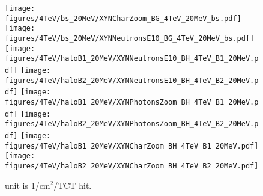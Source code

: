 \begin{figure}
  \begin{center}
    \texttt{[image: figures/4TeV/bs\_20MeV/XYNCharZoom\_BG\_4TeV\_20MeV\_bs.pdf]}
    \texttt{[image: figures/4TeV/bs\_20MeV/XYNNeutronsE10\_BG\_4TeV\_20MeV\_bs.pdf]}
    \texttt{[image: figures/4TeV/haloB1\_20MeV/XYNNeutronsE10\_BH\_4TeV\_B1\_20MeV.pdf]}
    \texttt{[image: figures/4TeV/haloB2\_20MeV/XYNNeutronsE10\_BH\_4TeV\_B2\_20MeV.pdf]}
    \texttt{[image: figures/4TeV/haloB1\_20MeV/XYNPhotonsZoom\_BH\_4TeV\_B1\_20MeV.pdf]}
    \texttt{[image: figures/4TeV/haloB2\_20MeV/XYNPhotonsZoom\_BH\_4TeV\_B2\_20MeV.pdf]}
    \texttt{[image: figures/4TeV/haloB1\_20MeV/XYNCharZoom\_BH\_4TeV\_B1\_20MeV.pdf]}
    \texttt{[image: figures/4TeV/haloB2\_20MeV/XYNCharZoom\_BH\_4TeV\_B2\_20MeV.pdf]}
    
\end{center}
\vspace{-0.6cm}
 \caption{unit is 1/cm$^{2}$/TCT hit.
  \label{fig:XYNPho}}
\end{figure}

